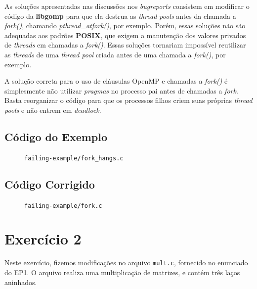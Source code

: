 \documentclass[a4paper, 12pt]{article}
\begin{document}
As soluções apresentadas nas discussões nos \textit{bugreports} consistem
em modificar o código da \textbf{libgomp} para que ela destrua as
\textit{thread pools} antes da chamada a \textit{fork()}, chamando
\textit{pthread\_atfork()}, por exemplo. Porém, essas soluções não são
adequadas aos padrões \textbf{POSIX}, que exigem a manutenção dos valores
privados de \textit{threads} em chamadas a \textit{fork()}. Essas soluções
tornariam impossível reutilizar as \textit{threads} de uma \textit{thread pool}
criada antes de uma chamada a \textit{fork()}, por exemplo.

A solução correta para o uso de cláusulas OpenMP e chamadas a \textit{fork()}
é simplesmente não utilizar \textit{pragmas} no processo pai antes de
chamadas a \textit{fork}. Basta reorganizar o código para que os processos
filhos criem suas próprias \textit{thread pools} e não entrem em
\textit{deadlock}.

\subsection{Código do Exemplo}\label{sec:example}
\begin{figure}[H]
    \centering
    
    \caption{\texttt{failing-example/fork\_hangs.c}}
    \label{fig:fork_hangs}
\end{figure}

\subsection{Código Corrigido}\label{sec:fixed}
\begin{figure}[H]
    \centering
    
    \caption{\texttt{failing-example/fork.c}}
    \label{fig:fork}
\end{figure}

\section{Exercício 2} \label{sec:ex2}

Neste exercício, fizemos modificações no arquivo \texttt{mult.c}, fornecido
no enunciado do EP1. O arquivo realiza uma multiplicação de matrizes,
e contém três laços aninhados.
\end{document}
